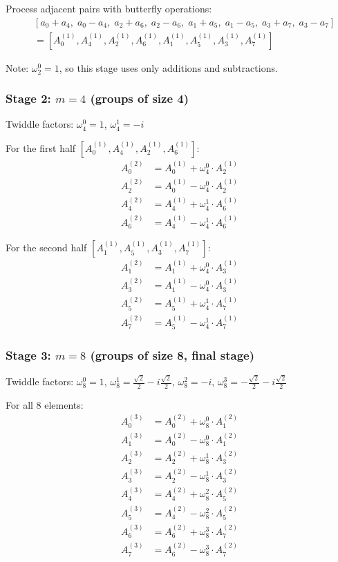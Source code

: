 \documentclass{article}
\begin{document}
Process adjacent pairs with butterfly operations:
\begin{align*}
\ &[a_0 + a_4, \; a_0 - a_4, \; a_2 + a_6, \; a_2 - a_6, \; a_1 + a_5, \; a_1 - a_5, \; a_3 + a_7, \; a_3 - a_7] \\
\ &= [A_0^{(1)}, A_4^{(1)}, A_2^{(1)}, A_6^{(1)}, A_1^{(1)}, A_5^{(1)}, A_3^{(1)}, A_7^{(1)}]
\end{align*}

Note: $\omega_2^0 = 1$, so this stage uses only additions and subtractions.

\subsubsection*{Stage 2: $m=4$ (groups of size 4)}

Twiddle factors: $\omega_4^0 = 1$, $\omega_4^1 = -i$

For the first half $[A_0^{(1)}, A_4^{(1)}, A_2^{(1)}, A_6^{(1)}]$:
\begin{align*}
A_0^{(2)} &= A_0^{(1)} + \omega_4^0 \cdot A_2^{(1)} \\
A_2^{(2)} &= A_0^{(1)} - \omega_4^0 \cdot A_2^{(1)} \\
A_4^{(2)} &= A_4^{(1)} + \omega_4^1 \cdot A_6^{(1)} \\
A_6^{(2)} &= A_4^{(1)} - \omega_4^1 \cdot A_6^{(1)}
\end{align*}

For the second half $[A_1^{(1)}, A_5^{(1)}, A_3^{(1)}, A_7^{(1)}]$:
\begin{align*}
A_1^{(2)} &= A_1^{(1)} + \omega_4^0 \cdot A_3^{(1)} \\
A_3^{(2)} &= A_1^{(1)} - \omega_4^0 \cdot A_3^{(1)} \\
A_5^{(2)} &= A_5^{(1)} + \omega_4^1 \cdot A_7^{(1)} \\
A_7^{(2)} &= A_5^{(1)} - \omega_4^1 \cdot A_7^{(1)}
\end{align*}

\subsubsection*{Stage 3: $m=8$ (groups of size 8, final stage)}

Twiddle factors: $\omega_8^0 = 1$, $\omega_8^1 = \frac{\sqrt{2}}{2} - i\frac{\sqrt{2}}{2}$, $\omega_8^2 = -i$, $\omega_8^3 = -\frac{\sqrt{2}}{2} - i\frac{\sqrt{2}}{2}$

For all 8 elements:
\begin{align*}
A_0^{(3)} &= A_0^{(2)} + \omega_8^0 \cdot A_1^{(2)} \\
A_1^{(3)} &= A_0^{(2)} - \omega_8^0 \cdot A_1^{(2)} \\
A_2^{(3)} &= A_2^{(2)} + \omega_8^1 \cdot A_3^{(2)} \\
A_3^{(3)} &= A_2^{(2)} - \omega_8^1 \cdot A_3^{(2)} \\
A_4^{(3)} &= A_4^{(2)} + \omega_8^2 \cdot A_5^{(2)} \\
A_5^{(3)} &= A_4^{(2)} - \omega_8^2 \cdot A_5^{(2)} \\
A_6^{(3)} &= A_6^{(2)} + \omega_8^3 \cdot A_7^{(2)} \\
A_7^{(3)} &= A_6^{(2)} - \omega_8^3 \cdot A_7^{(2)}
\end{align*}
\end{document}

